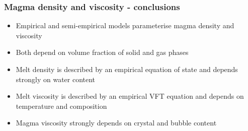 \documentclass{beamer}
\begin{document}

\begin{frame}
  \frametitle{Magma density and viscosity - conclusions}

  \begin{itemize}
  \item Empirical and semi-empirical models parameterise magma density and viscosity \\
    \vspace{0.5cm}
  \item Both depend on volume fraction of solid and gas phases \\
    \vspace{0.5cm}
  \item Melt density is described by an empirical equation of state and depends strongly on water content \\
    \vspace{0.5cm}
  \item Melt viscosity is described by an empirical VFT equation and depends on temperature and composition \\
    \vspace{0.5cm}
  \item Magma viscosity strongly depends on crystal and bubble content \\
  \end{itemize}
\end{frame}
\end{document}
